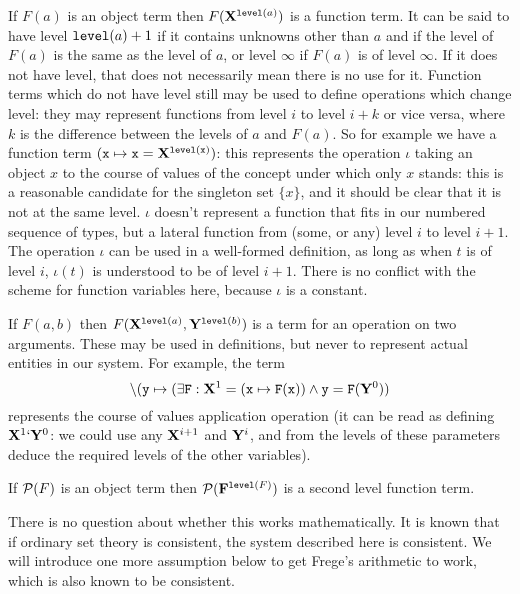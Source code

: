 \documentclass[12pt]{article}
\begin{document}
If $F(a)$ is an object term then $F({\bf X}^{{\tt level}(a)})$ is a function term.  It can be said to have level ${\tt level}(a)+1$ if it contains unknowns other than $a$ and if the level of
$F(a)$ is the same as the level of $a$, or level $\infty$ if $F(a)$ is of level $\infty$.  If it does not have level, that does not necessarily mean there is no use for it.   Function terms which do not have level still may be used
to define operations which change level:  they may represent functions from level $i$ to level $i+k$ or vice versa, where $k$ is the difference between the levels of $a$ and $F(a)$.
So for example we have a function term $({\tt x} \mapsto {\tt x} = {\bf X}^{{\tt level}({\tt x})})$:  this represents the operation $\iota$ taking an object $x$ to the course of values of the concept under which only $x$ stands:  this is a reasonable candidate for the singleton set $\{x\}$, and it should be clear that it is not at the same level.  $\iota$ doesn't represent a function that fits in our numbered sequence of types, but
a lateral function from (some, or any) level $i$ to level $i+1$.  The operation $\iota$ can be used in a well-formed definition, as long as when $t$ is of level $i$, $\iota(t)$ is understood to be of level $i+1$.  There is no conflict with the scheme for function variables here, because $\iota$ is a constant.

If $F(a,b)$ then $F({\bf X}^{{\tt level}(a)},{\bf Y}^{{\tt level}(b)})$ is a term for an operation on two arguments.  These may be used in definitions, but never to represent actual entities in our system.
For example, the term $$\backslash({\tt y}\mapsto (\exists {\tt F}: {\bf X}^1 = ({\tt x} \mapsto {\tt F}({\tt x})) \wedge {\tt y} = {\tt F}({\bf Y}^0))$$ represents the course of values application operation
(it can be read as defining ${\bf X}^1`{\bf Y}^0$:  we could use any ${\bf X}^{i+1}$ and ${\bf Y}^i$, and from the levels of these parameters deduce the required levels of the other variables).


If ${\cal P}(F)$ is an object term then ${\cal P}({\bf F}^{{\tt level}(F)})$ is a second level function term.

There is no question about whether this works mathematically.  It is known that if ordinary set theory is consistent, the system described here is consistent.  We will introduce one more assumption below
to get Frege's arithmetic to work, which is also known to be consistent.
\end{document}
